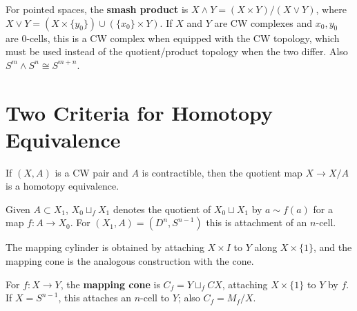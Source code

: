 \begin{definition}
\label{def:smash-product}


For pointed spaces, the \textbf{smash product} is
$X\wedge Y=(X\times Y)/(X\vee Y)$, where
$X\vee Y=(X\times\{y_0\})\cup(\{x_0\}\times Y)$. If $X$ and $Y$ are CW
complexes and $x_0,y_0$ are $0$-cells, this is a CW complex when equipped with
the CW topology, which must be used instead of the quotient/product topology
when the two differ. Also $S^m\wedge S^n\cong S^{m+n}$.
\end{definition}

\section{Two Criteria for Homotopy Equivalence}
\label{sec:two-criteria-homotopy-equivalence}

\begin{proposition}
\label{prop:collapsing-contractible-cw-subcomplex}



If $(X,A)$ is a CW pair and $A$ is contractible, then the quotient map
$X\to X/A$ is a homotopy equivalence.
\end{proposition}

\begin{definition}
\label{def:attaching-space}




Given $A\subset X_1$, $X_0\sqcup_fX_1$ denotes the quotient of $X_0\sqcup X_1$
by $a\sim f(a)$ for a map $f:A\to X_0$. For $(X_1,A)=(D^n,S^{n-1})$ this is
attachment of an $n$-cell.
\end{definition}

The mapping cylinder is obtained by attaching $X\times I$ to $Y$ along
$X\times\{1\}$, and the mapping cone is the analogous construction with the cone.

\begin{definition}
\label{def:mapping-cone}


For $f:X\to Y$, the \textbf{mapping cone} is
$C_f=Y\sqcup_f CX$, attaching $X\times\{1\}$ to $Y$ by $f$. If
$X=S^{n-1}$, this attaches an $n$-cell to $Y$; also $C_f=M_f/X$.
\end{definition}

